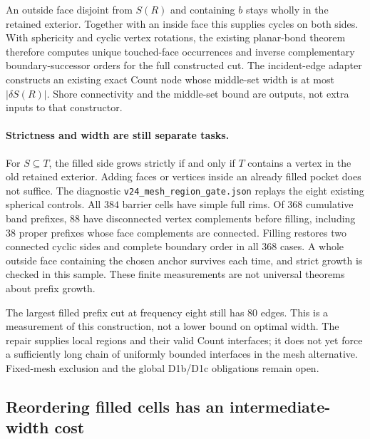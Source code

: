 An outside face disjoint from $S(R)$ and containing $b$ stays wholly in
the retained exterior. Together with an inside face this supplies cycles
on both sides. With sphericity and cyclic vertex rotations, the existing planar-bond theorem
therefore computes unique touched-face occurrences and inverse
complementary boundary-successor orders for the full constructed cut.
The incident-edge adapter constructs an existing exact Count node whose
middle-set width is at most $|\delta S(R)|$. Shore connectivity and the
middle-set bound are outputs, not extra inputs to that constructor.

\paragraph{Strictness and width are still separate tasks.}
For $S\subseteq T$, the filled side grows strictly if and only if $T$
contains a vertex in the old retained exterior. Adding faces or vertices
inside an already filled pocket does not suffice.
The diagnostic \texttt{v24\_mesh\_region\_gate.json} replays the eight
existing spherical controls. All $384$ barrier cells have simple full
rims. Of $368$ cumulative band prefixes, $88$ have disconnected vertex
complements before filling, including $38$ proper prefixes whose face
complements are connected. Filling restores two connected cyclic sides
and complete boundary order in all $368$ cases. A whole outside face
containing the chosen anchor survives each time, and strict growth is
checked in this sample. These finite measurements are not universal
theorems about prefix growth.

The largest filled prefix cut at frequency eight still has $80$ edges.
This is a measurement of this construction, not a lower bound on optimal
width. The repair supplies local regions and their valid Count interfaces;
it does not yet force a sufficiently long chain of uniformly bounded
interfaces in the mesh alternative. Fixed-mesh exclusion and the global
D1b/D1c obligations remain open.

\subsection{Reordering filled cells has an intermediate-width cost}
\label{sec:mesh-region-order-obstruction}

